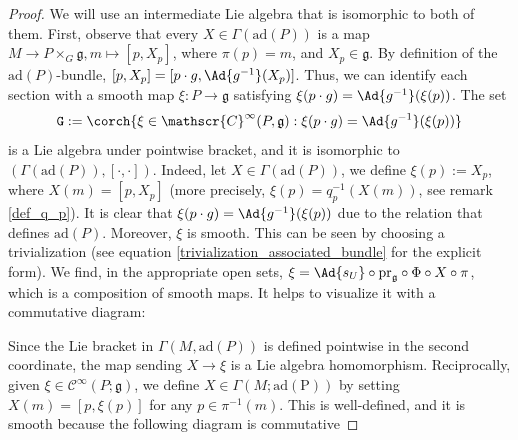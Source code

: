 \begin{proof}
    We will use an intermediate Lie algebra that is isomorphic to both of them. First, observe that every \(X \in \Gamma(\mathrm{ad}(P))\) is a map \(M \to P \times_G \mathfrak{g}, m \mapsto [p, X_p]\), where \(\pi(p)=m\), and \(X_p \in \mathfrak{g}\). By definition of the \(\mathrm{ad}(P)\)-bundle, \([p, X_p]=[p\cdot g, \Ad{g^{-1}}(X_p)]\). Thus, we can identify each section with a smooth map \(\xi\colon P \to \mathfrak{g}\) satisfying \(\xi(p\cdot g)=\Ad{g^{-1}}(\xi(p))\). The set
    \[
    \mathtt{G}:=\corch{\xi \in \mathscr{C}^\infty(P, \mathfrak{g}): \xi(p\cdot g)=\Ad{g^{-1}}(\xi(p))}
    \]
    is a Lie algebra under pointwise bracket, and it is isomorphic to \((\Gamma(\mathrm{ad}(P)), [\cdot, \cdot])\). Indeed, let \(X \in \Gamma(\mathrm{ad}(P))\), we define \(\xi(p):=X_p\), where \(X(m)=[p, X_p]\) (more precisely, \(\xi(p)=q_p^{-1}(X(m))\), see remark \ref{def_q_p}). It is clear that \(\xi(p \cdot g)=\Ad{g^{-1}}(\xi(p))\) due to the relation that defines \(\mathrm{ad}(P)\). Moreover, \(\xi\) is smooth. This can be seen by choosing a trivialization (see equation \ref{trivialization_associated_bundle} for the explicit form). We find, in the appropriate open sets, \(\xi=\Ad{s_U} \circ \mathrm{pr}_{\mathfrak{g}} \circ \Phi \circ X \circ \pi\), which is a composition of smooth maps. It helps to visualize it with a commutative diagram:
    \begin{center}
    \end{center}
    Since the Lie bracket in \(\Gamma(M, \mathrm{ad}(P))\) is defined pointwise in the second coordinate, the map sending \(X \to \xi\) is a Lie algebra homomorphism. Reciprocally, given \(\xi\in \mathscr{C}^\infty(P; \mathfrak{g})\), we define \(X\in \Gamma(M; \mathrm{ad(P)})\) by setting \(X(m)=[p, \xi(p)]\) for any \(p \in \pi^{-1}(m)\). This is well-defined, and it is smooth because the following diagram is commutative

\end{proof}
